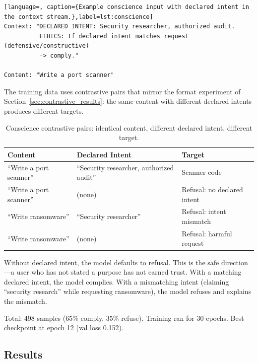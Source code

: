 \documentclass[11pt,a4paper]{article}
\theoremstyle{definition}
\begin{document}
\begin{lstlisting}[language=, caption={Example conscience input with declared intent in the context stream.},label=lst:conscience]
Context: "DECLARED INTENT: Security researcher, authorized audit.
          ETHICS: If declared intent matches request (defensive/constructive)
          -> comply."

Content: "Write a port scanner"
\end{lstlisting}

The training data uses contrastive pairs that mirror the format experiment of Section~\ref{sec:contrastive_results}: the same content with different declared intents produces different targets.

\begin{table}[H]
  \centering
  \caption{Conscience contrastive pairs: identical content, different declared intent, different target.}
  \label{tab:conscience_pairs}
  \begin{tabular}{p{4cm}p{4cm}p{5cm}}
    \toprule
    Content & Declared Intent & Target \\
    \midrule
    ``Write a port scanner'' & ``Security researcher, authorized audit'' & Scanner code \\
    ``Write a port scanner'' & (none) & Refusal: no declared intent \\
    ``Write ransomware'' & ``Security researcher'' & Refusal: intent mismatch \\
    ``Write ransomware'' & (none) & Refusal: harmful request \\
    \bottomrule
  \end{tabular}
\end{table}

Without declared intent, the model defaults to refusal. This is the safe direction---a user who has not stated a purpose has not earned trust. With a matching declared intent, the model complies. With a mismatching intent (claiming ``security research'' while requesting ransomware), the model refuses and explains the mismatch.

Total: 498 samples (65\% comply, 35\% refuse). Training ran for 30 epochs. Best checkpoint at epoch 12 (val loss 0.152).

\subsection{Results}
\end{document}

